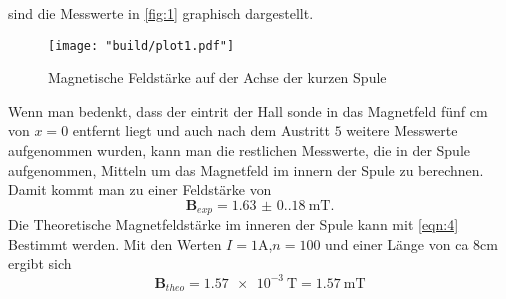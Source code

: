 sind die Messwerte in \autoref{fig:1} graphisch dargestellt.
\begin{figure}
    \caption{Magnetische Feldstärke auf der Achse der kurzen Spule}
    \label{fig:1}
    \centering
    \texttt{[image: "build/plot1.pdf"]}
\end{figure}
Wenn man bedenkt, dass der eintrit der Hall sonde in das Magnetfeld fünf \unit{\centi\meter} 
von $x = 0$ entfernt liegt und auch nach dem Austritt $5$ weitere Messwerte aufgenommen wurden, 
kann man die restlichen Messwerte, die in der Spule aufgenommen, Mitteln um das Magnetfeld im 
innern der Spule zu berechnen. Damit kommt man zu einer Feldstärke von 
\begin{equation*}
    \symbf{B}_{exp} = \qty{1.63(0.18)}{\milli\tesla}.
\end{equation*}
Die Theoretische Magnetfeldstärke im inneren der Spule kann mit \autoref{eqn:4} Bestimmt werden.
Mit den Werten $ I = 1\unit{\ampere}$,$ n = 100 $ und einer Länge von ca 8\unit{\centi\meter}
ergibt sich 
\begin{equation*}
    \symbf{B}_{theo} = \qty{1.57e-3}{\tesla} = \qty{1.57}{\milli\tesla}
\end{equation*}

